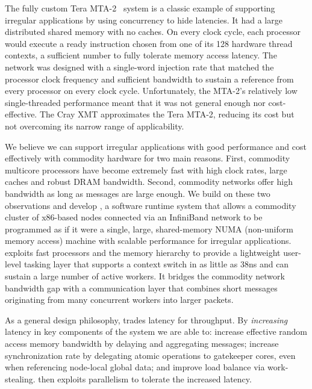 The fully custom Tera MTA-2~\cite{tera:mta1,Alverson:1992:EHP:143369.143408} system is a classic example of
supporting irregular applications by using concurrency to hide latencies. It
had a large distributed shared memory with no caches. On every clock cycle,
each processor would execute a ready instruction chosen from one of its 128
hardware thread contexts, a sufficient number to fully tolerate memory access
latency. The network was designed with a single-word injection rate that
matched the processor clock frequency and sufficient bandwidth to sustain a
reference from every processor on every clock cycle. Unfortunately, the MTA-2's relatively low single-threaded performance meant that it
was not general enough nor cost-effective. The Cray XMT approximates the Tera
MTA-2, reducing its cost but not overcoming its narrow range of applicability.

We believe we can support irregular applications with good performance and cost effectively with commodity hardware for two main reasons. First, commodity multicore processors have become extremely fast with high clock rates, large caches and robust DRAM bandwidth. Second, commodity networks offer high bandwidth as long as messages are large enough. We build on these two observations and develop \Grappa, a software runtime system that allows a commodity cluster of x86-based nodes connected via an InfiniBand network to be programmed as if it were a single, large, shared-memory NUMA (non-uniform memory access) machine with scalable performance for irregular applications. \Grappa exploits fast processors and the memory hierarchy to provide a lightweight user-level tasking layer that supports a context switch in as little as 38ns and can sustain a large number of active workers. It bridges the commodity network bandwidth gap with a communication layer that combines short messages originating from many concurrent workers into larger packets.

As a general design philosophy, \Grappa trades latency for throughput.  By \emph{increasing\/} latency in key components of the system we are able to: increase effective random access memory bandwidth by delaying and aggregating messages; increase synchronization rate by delegating atomic operations to gatekeeper cores, even when referencing node-local global data; and improve load balance via work-stealing.  \Grappa then exploits parallelism to tolerate the increased latency.

